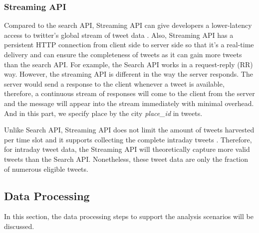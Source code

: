 \documentclass{article}
\begin{document}
\subsubsection{Streaming API}
Compared to the search API, Streaming API can give developers a lower-latency access to twitter’s global stream of tweet data
\cite{streaming-data}. Also, Streaming API has a persistent HTTP connection from client side to server side so that it’s a real-time delivery and can ensure the completeness of tweets as it can gain more tweets than the search API. For example, the Search API works in a request-reply (RR) way. However, the streaming API is different in the way the server responds. The server would send a response to the client whenever a tweet is available, therefore, a continuous stream of responses will come to the client from the server and the message will appear into the stream immediately with minimal overhead. And in this part, we specify place by the city \textit{place\_id} in tweets.

Unlike Search API, Streaming API does not limit the amount of tweets harvested per time slot and it supports collecting the complete intraday tweets
\cite{streaming-data}. Therefore, for intraday tweet data, the Streaming API will theoretically capture more valid tweets than the Search API. Nonetheless, these tweet data are only the fraction of numerous eligible tweets.

\subsection{Data Processing}
In this section, the data processing steps to support the analysis scenarios will be discussed.
\end{document}
